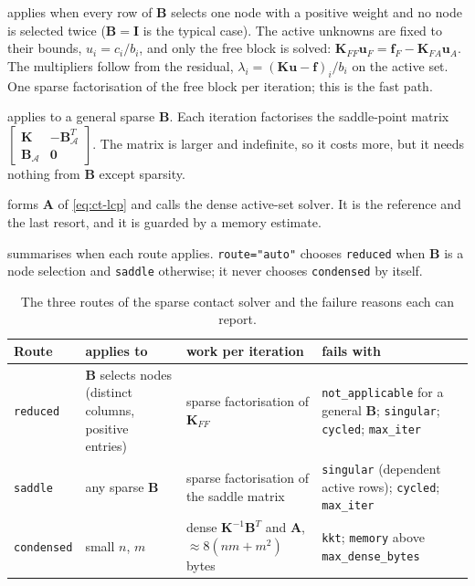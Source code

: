 \begin{description}[leftmargin=1em]
\item[\texttt{reduced}] applies when every row of $\bm B$ selects one node with a positive weight and no node is selected twice ($\bm B=\bm I$ is the typical case). The active unknowns are fixed to their bounds, $u_i=c_i/b_i$, and only the free block is solved: $\bm K_{FF}\bm u_F=\bm f_F-\bm K_{FA}\bm u_A$. The multipliers follow from the residual, $\lambda_i=(\bm K\bm u-\bm f)_i/b_i$ on the active set. One sparse factorisation of the free block per iteration; this is the fast path.
\item[\texttt{saddle}] applies to a general sparse $\bm B$. Each iteration factorises the saddle-point matrix $\begin{bmatrix}\bm K&-\bm B_{\mathcal A}^T\\ \bm B_{\mathcal A}&\bm 0\end{bmatrix}$. The matrix is larger and indefinite, so it costs more, but it needs nothing from $\bm B$ except sparsity.
\item[\texttt{condensed}] forms $\bm A$ of \eqref{eq:ct-lcp} and calls the dense active-set solver. It is the reference and the last resort, and it is guarded by a memory estimate.
\end{description}
 summarises when each route applies. \texttt{route="auto"} chooses \texttt{reduced} when $\bm B$ is a node selection and \texttt{saddle} otherwise; it never chooses \texttt{condensed} by itself.

\begin{table}[ht]
\centering\small
\begin{tabularx}{\linewidth}{@{}l X X X@{}}
\toprule
Route & applies to & work per iteration & fails with \\
\midrule
\texttt{reduced} & $\bm B$ selects nodes (distinct columns, positive entries) & sparse factorisation of $\bm K_{FF}$ & \texttt{not\_applicable} for a general $\bm B$; \texttt{singular}; \texttt{cycled}; \texttt{max\_iter} \\
\texttt{saddle} & any sparse $\bm B$ & sparse factorisation of the saddle matrix & \texttt{singular} (dependent active rows); \texttt{cycled}; \texttt{max\_iter} \\
\texttt{condensed} & small $n$, $m$ & dense $\bm K^{-1}\bm B^T$ and $\bm A$, $\approx 8(nm+m^2)$ bytes & \texttt{kkt}; \texttt{memory} above \texttt{max\_dense\_bytes} \\
\bottomrule
\end{tabularx}
\caption{The three routes of the sparse contact solver and the failure reasons each can report.}\label{tab:ct-routes}
\end{table}

